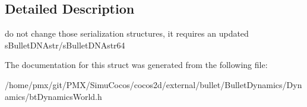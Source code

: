 \subsection{Detailed Description}
do not change those serialization structures, it requires an updated s\+Bullet\+D\+N\+Astr/s\+Bullet\+D\+N\+Astr64 

The documentation for this struct was generated from the following file\+:\begin{DoxyCompactItemize}
\item 
/home/pmx/git/\+P\+M\+X/\+Simu\+Cocos/cocos2d/external/bullet/\+Bullet\+Dynamics/\+Dynamics/bt\+Dynamics\+World.\+h\end{DoxyCompactItemize}
